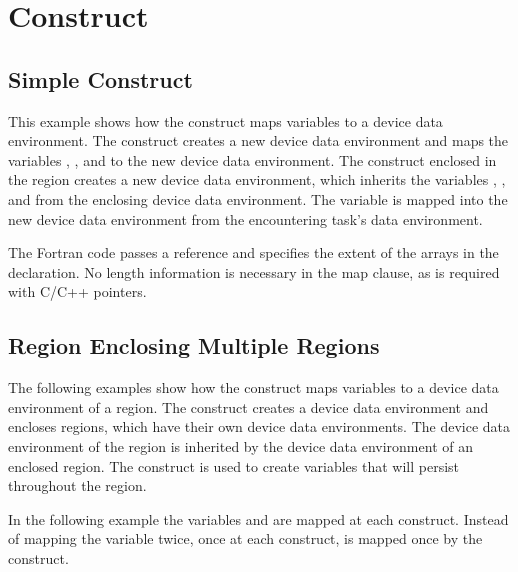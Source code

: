 \pagebreak
\section{  Construct}
\label{sec:target_data}

\subsection{Simple   Construct}
\label{subsec:target_data_simple}

This example shows how the   construct maps variables 
to a device data environment. The   construct creates 
a new device data environment and maps the variables , , and  to the new device 
data environment. The  construct enclosed in the  
 region creates a new device data environment, which inherits the 
variables , , and  from the enclosing device data environment. The variable 
 is mapped into the new device data environment from the encountering task's data 
environment.


\pagebreak
The Fortran code passes a reference and specifies the extent of the arrays in the 
declaration. No length information is necessary in the map clause, as is required 
with C/C++ pointers.


\subsection{  Region Enclosing Multiple  Regions}
\label{subsec:target_data_multiregion}

The following examples show how the   construct maps 
variables to a device data environment of a  region. The  
 construct creates a device data environment and encloses  
regions, which have their own device data environments. The device data environment 
of the   region is inherited by the device data environment 
of an enclosed  region. The   construct 
is used to create variables that will persist throughout the   
region.

In the following example the variables  and  are mapped at each  
construct. Instead of mapping the variable  twice, once at each  
construct,  is mapped once by the   construct.


